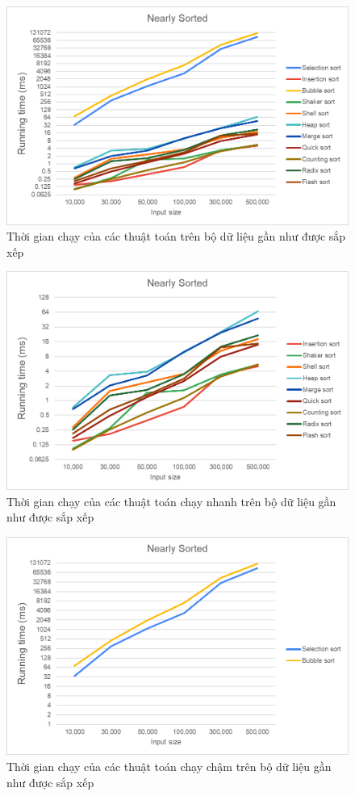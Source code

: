         \begin{figure}[H]
            \centering
            \includegraphics[width = 0.9\linewidth]{img/experiment/running time/nearly sorted/1.png}
            \caption{Thời gian chạy của các thuật toán trên bộ dữ liệu gần như được sắp xếp}
        \end{figure}
        
        \begin{figure}[H]
            \centering
            \includegraphics[width = 0.9\linewidth]{img/experiment/running time/nearly sorted/2.png}
            \caption{Thời gian chạy của các thuật toán chạy nhanh trên bộ dữ liệu gần như được sắp xếp}
        \end{figure}
        
        \begin{figure}[H]
            \centering
            \includegraphics[width = 0.9\linewidth]{img/experiment/running time/nearly sorted/3.png}
            \caption{Thời gian chạy của các thuật toán chạy chậm trên bộ dữ liệu gần như được sắp xếp}
        \end{figure}
    
